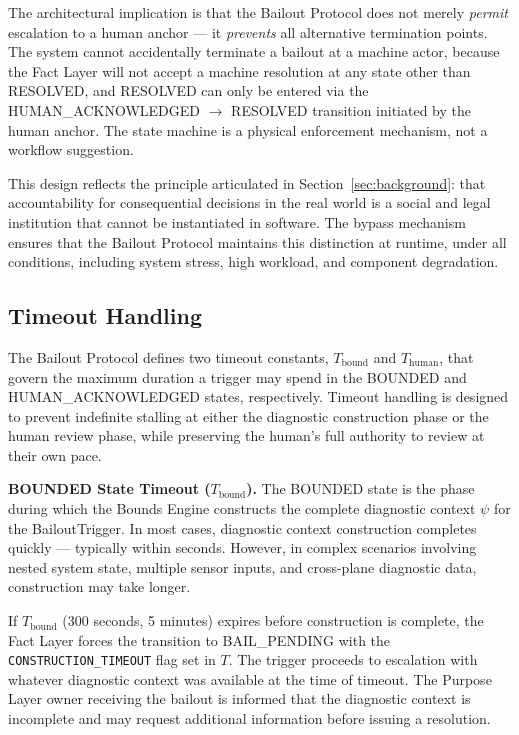 \documentclass[12pt]{article}
\begin{document}
The architectural implication is that the Bailout Protocol does not merely \textit{permit} escalation to a human anchor --- it \textit{prevents} all alternative termination points. The system cannot accidentally terminate a bailout at a machine actor, because the Fact Layer will not accept a machine resolution at any state other than RESOLVED, and RESOLVED can only be entered via the HUMAN\_ACKNOWLEDGED $\rightarrow$ RESOLVED transition initiated by the human anchor. The state machine is a physical enforcement mechanism, not a workflow suggestion.

This design reflects the principle articulated in Section~\ref{sec:background}: that accountability for consequential decisions in the real world is a social and legal institution that cannot be instantiated in software. The bypass mechanism ensures that the Bailout Protocol maintains this distinction at runtime, under all conditions, including system stress, high workload, and component degradation.

\subsection{Timeout Handling}
\label{sec:timeout-handling}

The Bailout Protocol defines two timeout constants, $T_{\text{bound}}$ and $T_{\text{human}}$, that govern the maximum duration a trigger may spend in the BOUNDED and HUMAN\_ACKNOWLEDGED states, respectively. Timeout handling is designed to prevent indefinite stalling at either the diagnostic construction phase or the human review phase, while preserving the human's full authority to review at their own pace.

\bigskip

\noindent\textbf{BOUNDED State Timeout ($T_{\text{bound}}$).} The BOUNDED state is the phase during which the Bounds Engine constructs the complete diagnostic context $\psi$ for the BailoutTrigger. In most cases, diagnostic context construction completes quickly --- typically within seconds. However, in complex scenarios involving nested system state, multiple sensor inputs, and cross-plane diagnostic data, construction may take longer.

If $T_{\text{bound}}$ (300 seconds, 5 minutes) expires before construction is complete, the Fact Layer forces the transition to BAIL\_PENDING with the \texttt{CONSTRUCTION\_TIMEOUT} flag set in $T$. The trigger proceeds to escalation with whatever diagnostic context was available at the time of timeout. The Purpose Layer owner receiving the bailout is informed that the diagnostic context is incomplete and may request additional information before issuing a resolution.
\end{document}
